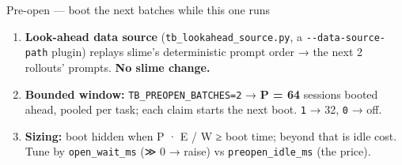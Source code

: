\documentclass[
  10pt,
  ignorenonframetext,
  aspectratio=169,
  t]{beamer}
\providecommand{\tightlist}{%
  \setlength{\itemsep}{0pt}\setlength{\parskip}{0pt}}
\begin{document}
\begin{frame}{Pre-open --- boot the next batches while this one
runs}
\protect\hypertarget{pre-open-boot-the-next-batches-while-this-one-runs}{}
\begin{enumerate}
\tightlist
\item
  \textbf{Look-ahead data source} (\texttt{tb\_lookahead\_source.py}, a
  \texttt{-\/-data-source-path} plugin) replays slime's deterministic
  prompt order → the next 2 rollouts' prompts. \textbf{No slime change.}
\item
  \textbf{Bounded window:} \texttt{TB\_PREOPEN\_BATCHES=2} → \textbf{P =
  64} sessions booted ahead, pooled per task; each claim starts the next
  boot. \texttt{1} → 32, \texttt{0} → off.
\item
  \textbf{Sizing:} boot hidden when P · E / W ≥ boot time; beyond that
  is idle cost. Tune by \texttt{open\_wait\_ms} (≫ 0 → raise) vs
  \texttt{preopen\_idle\_ms} (the price).
\end{enumerate}

\small


\end{frame}
\end{document}
